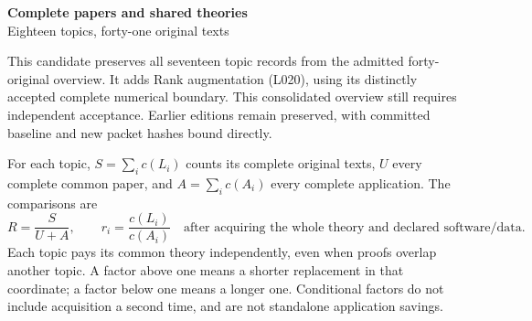 \documentclass[11pt,a4paper]{article}
\begin{document}
\begin{center}\Large\textbf{Complete papers and shared theories}\\[4pt]
\normalsize Eighteen topics, forty-one original texts\end{center}
This candidate preserves all seventeen topic records from the admitted forty-original overview. It adds Rank augmentation (L020), using its distinctly accepted complete numerical boundary. This consolidated overview still requires independent acceptance. Earlier editions remain preserved, with committed baseline and new packet hashes bound directly.

For each topic, $S=\sum_i c(L_i)$ counts its complete original texts, $U$ every complete common paper, and $A=\sum_i c(A_i)$ every complete application. The comparisons are
\[
 R=\frac{S}{U+A},\qquad r_i=\frac{c(L_i)}{c(A_i)}
 \quad\text{after acquiring the whole theory and declared software/data.}
\]
Each topic pays its common theory independently, even when proofs overlap another topic. A factor above one means a shorter replacement in that coordinate; a factor below one means a longer one. Conditional factors do not include acquisition a second time, and are not standalone application savings.
\end{document}
